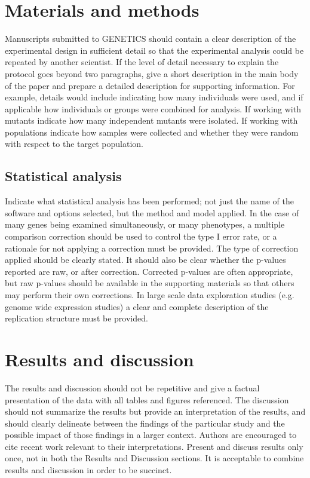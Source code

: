 \documentclass[10pt,twocolumn,twoside,lineno]{gsajnl}
\begin{document}
\section{Materials and methods}
\label{sec:materials:methods}

Manuscripts submitted to GENETICS should contain a clear description of the experimental design in sufficient detail so that the experimental analysis could be repeated by another scientist. If the level of detail necessary to explain the protocol goes beyond two paragraphs, give a short description in the main body of the paper and prepare a detailed description for supporting information.  For example, details would include indicating how many individuals were used, and if applicable how individuals or groups were combined for analysis. If working with mutants indicate how many independent mutants were isolated. If working with populations indicate how samples were collected and whether they were random with respect to the target population.


\subsection{Statistical analysis}

Indicate what statistical analysis has been performed; not just the name of the software and options selected, but the method and model applied. In the case of many genes being examined simultaneously, or many phenotypes, a multiple comparison correction should be used to control the type I error rate, or a rationale for not applying a correction must be provided. The type of correction applied should be clearly stated. It should also be clear whether the p-values reported are raw, or after correction. Corrected p-values are often appropriate, but raw p-values should be available in the supporting materials so that others may perform their own corrections. In large scale data exploration studies (e.g. genome wide expression studies) a clear and complete description of the replication structure must be provided.

\section{Results and discussion}

The results and discussion should not be repetitive and give a factual presentation of the data with all tables and figures referenced. The discussion should not summarize the results but provide an interpretation of the results, and should clearly delineate between the findings of the particular study and the possible impact of those findings in a larger context. Authors are encouraged to cite recent work relevant to their interpretations. Present and discuss results only once, not in both the Results and Discussion sections. It is acceptable to combine results and discussion in order to be succinct.
\end{document}

